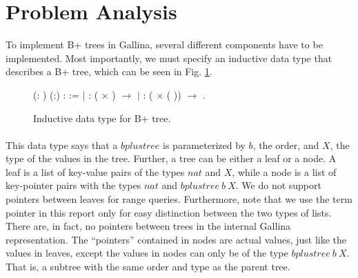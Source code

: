 \section{Problem Analysis}
\label{sec:ProblemAnalysis}
To implement B+ trees in Gallina, several different components have to be implemented. Most importantly, we must specify an inductive data type that describes a B+ tree, which can be seen in Fig. \ref{fig:inductive_data_type}.

\begin{figure}
\centering
\begin{coqdoccode}
  (: ) (:) :  :=\coqdoceol
\coqdocindent{1.00em}
\ensuremath{|}  :  ( \ensuremath{\times} ) \ensuremath{\rightarrow}   \coqdoceol
\coqdocindent{1.00em}
\ensuremath{|}  :  ( \ensuremath{\times} (  )) \ensuremath{\rightarrow}   .\coqdoceol
\end{coqdoccode}
\caption{Inductive data type for B+ tree.}
\label{fig:inductive_data_type}
\end{figure}

\paragraph{}
This data type says that a $bplustree$ is parameterized by $b$, the order, and $X$, the type of the values in the tree. Further, a tree can be either a leaf or a node. A leaf is a list of key-value pairs of the types $nat$ and $X$, while a node is a list of key-pointer pairs with the types $nat$ and $bplustree~b~X$. We do not support pointers between leaves for range queries. Furthermore, note that we use the term pointer in this report only for easy distinction between the two types of lists. There are, in fact, no pointers between trees in the internal Gallina representation. The ``pointers'' contained in nodes are actual values, just like the values in leaves, except the values in nodes can only be of the type $bplustree~b~X$. That is, a subtree with the same order and type as the parent tree.


